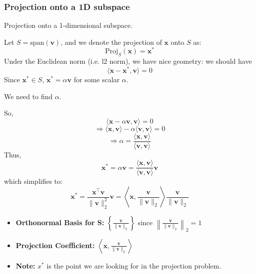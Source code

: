    \subsubsection{Projection onto a 1D subspace}
        \begin{example}
            Projection onto a 1-dimensional subspace.

            Let \( S = \text{span}(\mathbf{v}) \), and we denote the projection of \( \mathbf{x} \) onto \( S \) as:
            \[
            \text{Proj}_S(\mathbf{x}) = \mathbf{x}^*
            \]
            Under the Euclidean norm (i.e. l2 norm), we have nice geometry: we should have
            \[
            \langle \mathbf{x} - \mathbf{x}^*, \mathbf{v} \rangle = 0
            \]
            Since \( \mathbf{x}^* \in S \), \( \mathbf{x}^* = \alpha \mathbf{v} \) for some scalar \( \alpha \).

            We need to find \( \alpha \).

            So,
            \[
            \langle \mathbf{x} - \alpha \mathbf{v}, \mathbf{v} \rangle = 0
            \]
            \[
            \Rightarrow \langle \mathbf{x}, \mathbf{v} \rangle - \alpha \langle \mathbf{v}, \mathbf{v} \rangle = 0
            \]
            \[
            \Rightarrow \alpha = \frac{\langle \mathbf{x}, \mathbf{v} \rangle}{\langle \mathbf{v}, \mathbf{v} \rangle}
            \]
            Thus, 
            \[
            \mathbf{x}^* = \alpha \mathbf{v} = \frac{\langle \mathbf{x}, \mathbf{v} \rangle}{\langle \mathbf{v}, \mathbf{v} \rangle} \mathbf{v}
            \]
            which simplifies to:
            \[
            \mathbf{x}^* = \frac{\mathbf{x}^\top \mathbf{v}}{\|\mathbf{v}\|_2^2} \mathbf{v} = \left\langle \mathbf{x}, \frac{\mathbf{v}}{\|\mathbf{v}\|_2} \right\rangle \frac{\mathbf{v}}{\|\mathbf{v}\|_2}
            \]
            \begin{itemize}
                \item \textbf{Orthonormal Basis for S:} \( \left\{ \frac{\mathbf{v}}{\|\mathbf{v}\|_2} \right\} \) since \( \left\lVert \frac{\mathbf{v}}{\|\mathbf{v}\|_2} \right\rVert_2 = 1 \)
                \item \textbf{Projection Coefficient:} $\left\langle \mathbf{x}, \frac{\mathbf{v}}{\|\mathbf{v}\|_2} \right\rangle$
                \item \textbf{Note:} $x^*$ is the point we are looking for in the projection problem.
            \end{itemize}
        \end{example}


